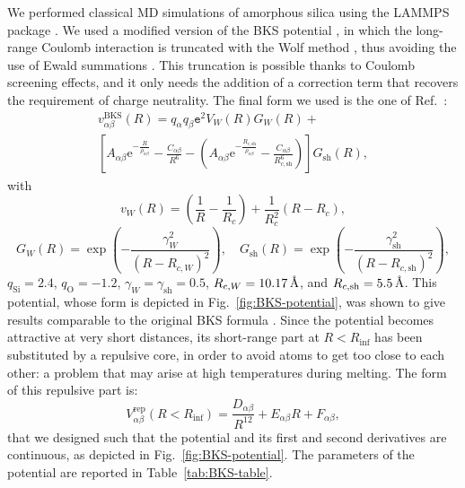 We performed classical MD simulations of amorphous silica using the \textsc{LAMMPS} package \cite{LAMMPS1995}. 
We used a modified version of the BKS potential \cite{Carre2008}, in which the long-range Coulomb interaction is truncated with the Wolf method \cite{Wolf1992,Wolf1999,Fennel2006}, thus avoiding the use of Ewald summations \cite{Allen1989,Frenkel2001}. This truncation is possible thanks to Coulomb screening effects, and it only needs the addition of a correction term that recovers the requirement of charge neutrality. 
The final form we used is the one of Ref.~\cite{Mantisi2012}:
\begin{multline}
    v_{\alpha\beta}^{\mathrm{BKS}}(R) = q_\alpha q_\beta \mathtt{e}^2 V_W(R) G_W(R) + \\
    \left[ A_{\alpha\beta} \mathrm{e}^{-\frac{R}{\rho_{\alpha\beta}}} - \frac{C_{\alpha\beta}}{R^6} - \left( A_{\alpha\beta} \mathrm{e}^{-\frac{R_{c,\mathrm{sh}}}{\rho_{\alpha\beta}}} - \frac{C_{\alpha\beta}}{R_{c,\mathrm{sh}}^6} \right) \right] G_{\mathrm{sh}}(R) , \label{eq:BKS-Wolf}
\end{multline}
with
\begin{equation}
    v_W(R) = \left(\frac{1}{R}-\frac{1}{R_c}\right) + \frac{1}{R_c^2}\left(R-R_c\right) ,
\end{equation}
\begin{equation}
    G_W(R) = \exp \left( -\frac{\gamma_W^2}{(R-R_{c,W})^2} \right) , \quad
    G_{\mathrm{sh}}(R) = \exp \left( -\frac{\gamma_{\mathrm{sh}}^2}{(R-R_{c,\mathrm{sh}})^2} \right) ,
\end{equation}
$q_{\mathrm{Si}}=2.4$, $q_{\mathrm{O}}=-1.2$, $\gamma_W = \gamma_{\mathrm{sh}} = 0.5$, $R_{c,W} = 10.17\,\mathrm{{\mbox{\AA}}}$, and $R_{c,\mathrm{sh}} = 5.5 \,\mathrm{{\mbox{\AA}}}$.
This potential, whose form is depicted in Fig.~\ref{fig:BKS-potential}, was shown to give results comparable to the original BKS formula \cite{Carre2008}. 
Since the potential becomes attractive at very short distances, its short-range part at $R < R_{\mathrm{inf}}$ has been substituted by a repulsive core, in order to avoid atoms to get too close to each other: a problem that may arise at high temperatures during melting. The form of this repulsive part is:
\begin{equation}
    V_{\alpha\beta}^{\mathrm{rep}}(R < R_{\mathrm{inf}}) = \frac{D_{\alpha\beta}}{R^{12}} + E_{\alpha\beta}R + F_{\alpha\beta}, \label{eq:BKS-repulsive-core}
\end{equation}
that we designed such that the potential and its first and second derivatives are continuous, as depicted in Fig.~\ref{fig:BKS-potential}. The parameters of the potential are reported in Table~\ref{tab:BKS-table}. 

